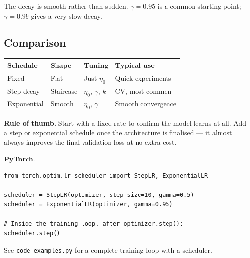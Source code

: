 \documentclass[12pt, a4paper]{article}
\theoremstyle{definition}
\begin{document}
The decay is smooth rather than sudden.  $\gamma=0.95$ is a common
starting point; $\gamma=0.99$ gives a very slow decay.

\subsection{Comparison}

\begin{center}
\renewcommand{\arraystretch}{1.3}
\begin{tabular}{llll}
\toprule
Schedule & Shape & Tuning & Typical use \\
\midrule
Fixed          & Flat      & Just $\eta_0$            & Quick experiments \\
Step decay     & Staircase & $\eta_0$, $\gamma$, $k$  & CV, most common \\
Exponential    & Smooth    & $\eta_0$, $\gamma$        & Smooth convergence \\
\bottomrule
\end{tabular}
\end{center}

\begin{keybox}
\textbf{Rule of thumb.}
Start with a fixed rate to confirm the model learns at all.
Add a step or exponential schedule once the architecture is finalised ---
it almost always improves the final validation loss at no extra cost.
\end{keybox}

\begin{notebox}
\textbf{PyTorch.}
\begin{verbatim}
from torch.optim.lr_scheduler import StepLR, ExponentialLR

scheduler = StepLR(optimizer, step_size=10, gamma=0.5)
scheduler = ExponentialLR(optimizer, gamma=0.95)

# Inside the training loop, after optimizer.step():
scheduler.step()
\end{verbatim}
See \texttt{code\_examples.py} for a complete training loop with a scheduler.
\end{notebox}
\end{document}

